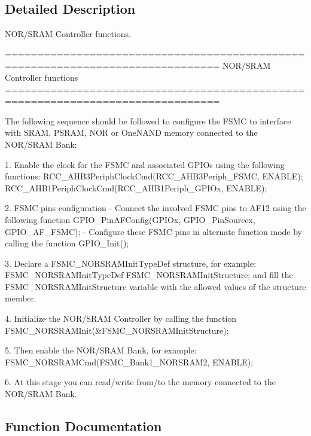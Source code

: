 \subsection{Detailed Description}
N\+O\+R/\+S\+R\+A\+M Controller functions. 

\begin{DoxyVerb} ===============================================================================
                    NOR/SRAM Controller functions
 ===============================================================================  

 The following sequence should be followed to configure the FSMC to interface with
 SRAM, PSRAM, NOR or OneNAND memory connected to the NOR/SRAM Bank:
 
   1. Enable the clock for the FSMC and associated GPIOs using the following functions:
          RCC_AHB3PeriphClockCmd(RCC_AHB3Periph_FSMC, ENABLE);
          RCC_AHB1PeriphClockCmd(RCC_AHB1Periph_GPIOx, ENABLE);

   2. FSMC pins configuration 
       - Connect the involved FSMC pins to AF12 using the following function 
          GPIO_PinAFConfig(GPIOx, GPIO_PinSourcex, GPIO_AF_FSMC); 
       - Configure these FSMC pins in alternate function mode by calling the function
          GPIO_Init();    
       
   3. Declare a FSMC_NORSRAMInitTypeDef structure, for example:
          FSMC_NORSRAMInitTypeDef  FSMC_NORSRAMInitStructure;
      and fill the FSMC_NORSRAMInitStructure variable with the allowed values of
      the structure member.
      
   4. Initialize the NOR/SRAM Controller by calling the function
          FSMC_NORSRAMInit(&FSMC_NORSRAMInitStructure); 

   5. Then enable the NOR/SRAM Bank, for example:
          FSMC_NORSRAMCmd(FSMC_Bank1_NORSRAM2, ENABLE);  

   6. At this stage you can read/write from/to the memory connected to the NOR/SRAM Bank. \end{DoxyVerb}
 

\subsection{Function Documentation}
\hypertarget{group___f_s_m_c___group1_gaf943f0f2680168d3a95a3c2c9f3eca2a}{}
